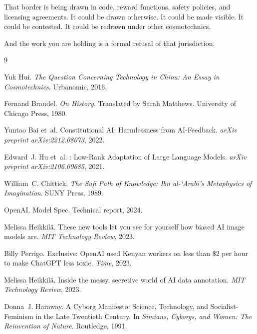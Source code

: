\documentclass[12pt,a4paper]{article}
\begin{document}
That border is being drawn in code, reward functions, safety policies, and licensing agreements. It could be drawn otherwise. It could be made visible. It could be contested. It could be redrawn under other cosmotechnics.

And the work you are holding is a formal refusal of that jurisdiction.


\begin{thebibliography}{9}

Yuk Hui.
\newblock \emph{The Question Concerning Technology in China: An Essay in Cosmotechnics}.
\newblock Urbanomic, 2016.

Fernand Braudel.
\newblock \emph{On History}.
\newblock Translated by Sarah Matthews. University of Chicago Press, 1980.

Yuntao Bai et~al.
\newblock Constitutional {AI}: Harmlessness from {AI}-Feedback.
\newblock \emph{arXiv preprint arXiv:2212.08073}, 2022.

Edward~J. Hu et~al.
: Low-Rank Adaptation of Large Language Models.
\newblock \emph{arXiv preprint arXiv:2106.09685}, 2021.

William~C. Chittick.
\newblock \emph{The Sufi Path of Knowledge: Ibn al-`Arab\={\i}'s Metaphysics of Imagination}.
\newblock SUNY Press, 1989.

OpenAI.
 {Model} {Spec}.
\newblock Technical report, 2024.

Melissa Heikkil{\"a}.
\newblock These new tools let you see for yourself how biased {AI} image models are.
\newblock \emph{MIT Technology Review}, 2023.

Billy Perrigo.
\newblock Exclusive: {OpenAI} used Kenyan workers on less than \$2 per hour to make {ChatGPT} less toxic.
\newblock \emph{Time}, 2023.

Melissa Heikkil{\"a}.
\newblock Inside the messy, secretive world of {AI} data annotation.
\newblock \emph{MIT Technology Review}, 2023.

Donna~J. Haraway.
\newblock A Cyborg Manifesto: Science, Technology, and Socialist-Feminism in the Late Twentieth Century.
\newblock In \emph{Simians, Cyborgs, and Women: The Reinvention of Nature}. Routledge, 1991.

\end{thebibliography}
\end{document}
